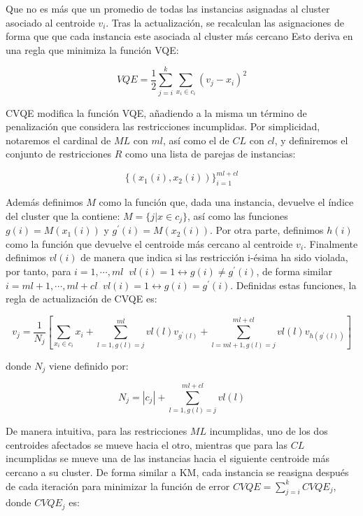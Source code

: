 Que no es más que un promedio de todas las instancias asignadas al cluster asociado al centroide $v_i$. Tras la actualización, se recalculan las asignaciones de forma que que cada instancia este asociada al cluster más cercano Esto deriva en una regla que minimiza la función \acf{VQE}:

\begin{equation}
VQE = \frac{1}{2} \sum_{j = i}^{k} \sum_{x_i \in c_i} (v_j - x_i)^2
\label{eqn28}
\end{equation}

\acs{CVQE} modifica la función \acs{VQE}, añadiendo a la misma un término de penalización que considera las restricciones incumplidas. Por simplicidad, notaremos el cardinal de $ML$ con $ml$, así como el de $CL$ con $cl$, y definiremos el conjunto de restricciones $R$ como una lista de parejas de instancias: 

\begin{equation}
\{(x_1(i), x_2(i))\}_{i=1}^{ml+cl}
\label{eqn29}
\end{equation}

Además definimos $M$ como la función que, dada una instancia, devuelve el índice del cluster que la contiene: $M = \{j | x \in c_j\}$, así como las funciones $g(i) = M(x_1(i))$ y $g^\prime(i) = M(x_2(i))$. Por otra parte, definimos $h(i)$ como la función que devuelve el centroide más cercano al centroide $v_i$. Finalmente definimos $vl(i)$ de manera que indica si las restricción i-ésima ha sido violada, por tanto, para $i = 1, \cdots , ml \;\; vl(i) = 1 \leftrightarrow g(i) \neq g^\prime(i)$, de forma similar $i = ml + 1, \cdots , ml + cl \;\; vl(i) = 1 \leftrightarrow g(i) = g^\prime(i)$. Definidas estas funciones, la regla de actualización de \acs{CVQE} es:

\begin{equation}
v_j = \frac{1}{N_j} \left[ \sum_{x_i \in c_i}x_i + 
\sum_{l=1,g(l) = j}^{ml} vl(l) v_{g^\prime(l)} + 
\sum_{l=ml + 1,g(l) = j}^{ml + cl} vl(l) v_{h(g^\prime(l))}
\right]
\label{eqn30}
\end{equation}

donde $N_j$ viene definido por: 

\begin{equation}
N_j = |c_j| + \sum_{l=1,g(l) = j}^{ml + cl} vl(l)
\label{eqn31}
\end{equation}

De manera intuitiva, para las restricciones $ML$ incumplidas, uno de los dos centroides afectados se mueve hacia el otro, mientras que para las $CL$ incumplidas se mueve una de las instancias hacia el siguiente centroide más cercano a su cluster. De forma similar a \acs{KM}, cada instancia se reasigna después de cada iteración para minimizar la función de error $CVQE = \sum_{j=i}^{k} CVQE_j$, donde $CVQE_j$ es:

